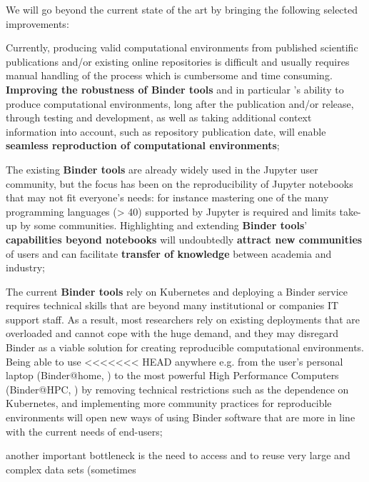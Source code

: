 We will go beyond the current state of the art by bringing the following selected improvements:
\begin{compactitem}
\item Currently, producing valid computational environments from published scientific publications and/or existing
      online repositories is difficult and usually requires manual handling of the process which is cumbersome and
      time consuming. \textbf{Improving the robustness of Binder tools} and in particular \repotodocker{}'s ability to
      produce computational environments, long after the publication and/or release,
      through testing and development, as well as taking additional context information into account,
      such as repository publication date, will enable \textbf{seamless reproduction of computational environments};
\item The existing \textbf{Binder tools} are already widely used in the Jupyter user community,
      but the focus has been on the reproducibility of Jupyter notebooks that may not fit everyone’s needs:
      for instance mastering one of the many programming languages (> 40) supported by Jupyter is required and limits take-up by some communities.
      Highlighting and extending \textbf{Binder tools}' \textbf{capabilities beyond notebooks}
      will undoubtedly \textbf{attract new communities} of users and can facilitate
      \textbf{transfer of knowledge} between academia and industry;
\item The current \textbf{Binder tools} rely on Kubernetes and deploying a Binder service requires technical skills that are
      beyond many institutional or companies IT support staff. As a result, most researchers rely on existing
      deployments that are overloaded and cannot cope with the huge demand, and they may disregard Binder
      as a viable solution for creating reproducible computational environments. Being able to use \repotodocker{}
<<<<<<< HEAD
      anywhere e.g. from the user’s personal laptop (Binder@home, ) to the
      most powerful High Performance Computers (Binder@HPC, ) by removing technical restrictions such as the dependence on Kubernetes, and implementing more community practices for reproducible environments will open new ways of using Binder software that are more in line with the current needs of end-users;
\item another important bottleneck is the need to access and to reuse very large and complex data sets (sometimes

\end{compactitem}

